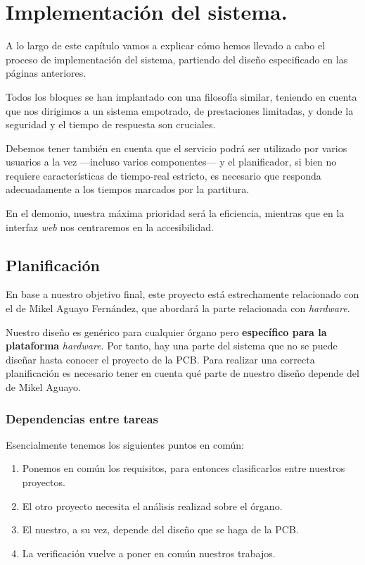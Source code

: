 \chapter{Implementación del sistema.}
\label{cap: capitulo_5}

A lo largo de este capítulo vamos a explicar cómo hemos llevado a cabo el proceso de implementación del sistema, partiendo del diseño especificado en las páginas anteriores.

Todos los bloques se han implantado con una filosofía similar, teniendo en cuenta que nos dirigimos a un sistema empotrado, de prestaciones limitadas, y donde la seguridad y el tiempo de respuesta son cruciales.

Debemos tener también en cuenta que el servicio podrá ser utilizado por varios usuarios a la vez ---incluso varios componentes--- y el planificador, si bien no requiere características de tiempo-real estricto, es necesario que responda adecuadamente a los tiempos marcados por la partitura.

En el demonio, nuestra máxima prioridad será la eficiencia, mientras que en la interfaz \textit{web} nos centraremos en la accesibilidad.

\section{Planificación}

En base a nuestro objetivo final, este proyecto está estrechamente relacionado con el de Mikel Aguayo Fernández, que abordará la parte relacionada con \textit{hardware}.

Nuestro diseño es genérico para cualquier órgano pero \textbf{específico para la plataforma} \textit{hardware}. Por tanto, hay una parte del sistema que no se puede diseñar hasta conocer el proyecto de la \acrshort{PCB}. Para realizar una correcta planificación es necesario tener en cuenta qué parte de nuestro diseño depende del de Mikel Aguayo.

\subsection{Dependencias entre tareas}

Esencialmente tenemos los siguientes puntos en común:

\begin{enumerate}
	\item Ponemos en común los requisitos, para entonces clasificarlos entre nuestros proyectos.
	\item El otro proyecto necesita el análisis realizad sobre el órgano.
	\item El nuestro, a su vez, depende del diseño que se haga de la \acrshort{PCB}.
	\item La verificación vuelve a poner en común nuestros trabajos.
\end{enumerate}

